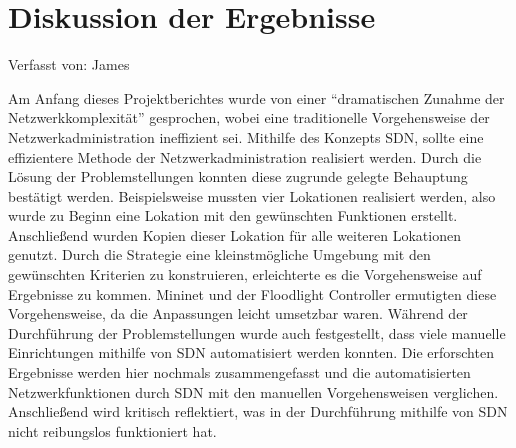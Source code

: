 \documentclass[fontsize=12pt,paper=a4,open=any,parskip=half,
  twoside=false,toc=listof,toc=bibliography,fleqn,leqno,
  captions=nooneline,captions=tableabove,british]{scrbook}
\begin{document}
{\chapter{Diskussion der Ergebnisse}
{\tiny Verfasst von: James\par}
Am Anfang dieses Projektberichtes wurde von einer “dramatischen Zunahme der Netzwerkkomplexität” gesprochen, wobei eine traditionelle Vorgehensweise der Netzwerkadministration ineffizient sei. Mithilfe des Konzepts SDN, sollte eine effizientere Methode der Netzwerkadministration realisiert werden. Durch die Lösung der Problemstellungen konnten diese zugrunde gelegte Behauptung bestätigt werden. Beispielsweise mussten vier Lokationen realisiert werden, also wurde zu Beginn eine Lokation mit den gewünschten Funktionen erstellt. Anschließend wurden Kopien dieser Lokation für alle weiteren Lokationen genutzt. Durch die Strategie eine kleinstmögliche Umgebung mit den gewünschten Kriterien zu konstruieren, erleichterte es die Vorgehensweise auf Ergebnisse zu kommen. Mininet und der Floodlight Controller ermutigten diese Vorgehensweise, da die Anpassungen leicht umsetzbar waren. Während der Durchführung der Problemstellungen wurde auch festgestellt, dass viele manuelle Einrichtungen mithilfe von SDN automatisiert werden konnten. Die erforschten Ergebnisse werden hier nochmals zusammengefasst und die automatisierten Netzwerkfunktionen durch SDN mit den manuellen Vorgehensweisen verglichen. Anschließend wird kritisch reflektiert, was in der Durchführung mithilfe von SDN nicht reibungslos funktioniert hat.  
}
\end{document}
